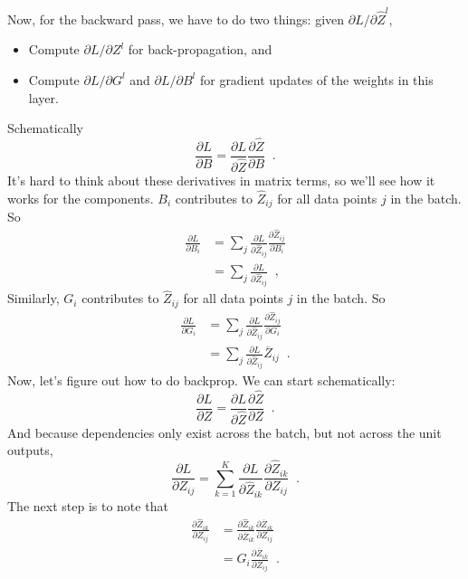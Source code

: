Now, for the backward pass, we have to do two things:  given
$\partial L / \partial \widehat{Z}^l$, 
\begin{itemize}
\item Compute $\partial L / \partial Z^l$ for back-propagation, and
\item Compute $\partial L / \partial G^l$ and $\partial L / \partial
  B^l$ for gradient updates of the weights in this layer.
\end{itemize}

Schematically
\[\frac{\partial L}{\partial B} = \frac{\partial L}{\partial
    \widehat{Z}}\frac{\partial \widehat{Z}}{\partial B}\;\;.\]
It's hard to think about these derivatives in matrix terms, so we'll
see how it works for the components.  
$B_i$ contributes to $\widehat{Z}_{ij}$ for all data points $j$ in the
batch.  So
\begin{align*}
  \frac{\partial L}{\partial B_i} & =
                     \sum_j \frac{\partial L}{\partial \widehat{Z}_{ij}}
                     \frac{\partial \widehat{Z}_{ij}}{\partial B_i} \\
                                  & = \sum_j \frac{\partial L}{\partial \widehat{Z}_{ij}}\;\;,
                                    \end{align*}
Similarly, $G_i$ contributes to $\widehat{Z}_{ij}$ for all data points
$j$ in the batch.  So
\begin{align*}
  \frac{\partial L}{\partial G_i} & =
                     \sum_j \frac{\partial L}{\partial \widehat{Z}_{ij}}
                     \frac{\partial \widehat{Z}_{ij}}{\partial G_i} \\
             & =  \sum_j \frac{\partial L}{\partial \widehat{Z}_{ij}} \overline{Z}_{ij}\;\;.
\end{align*}
Now, let's figure out how to do backprop.  We can start schematically:
\[\frac{\partial L}{\partial Z} = \frac{\partial L}{\partial \widehat{Z}}
                               \frac{\partial \widehat{Z}}{\partial Z}\;\;.\]
And because dependencies only exist across the batch, but not across
the unit outputs, 
\[\frac{\partial L}{\partial Z_{ij}} =
  \sum_{k=1}^K\frac{\partial L}{\partial \widehat{Z}_{ik}}
                            \frac{\partial \widehat{Z}_{ik}}{\partial Z_{ij}}\;\;.\]
The next step is to note that
\begin{align*}                          
\frac{\partial \widehat{Z}_{ik}}{\partial Z_{ij}} &=
  \frac{\partial \widehat{Z}_{ik}}{\partial \overline{Z}_{ik}}
  \frac{\partial \overline{Z}_{ik}}{\partial Z_{ij}} \\
&= G_i \frac{\partial \overline{Z}_{ik}}{\partial Z_{ij}}\;\;.
\end{align*}                          
